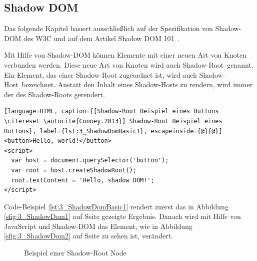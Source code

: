 \subsection{Shadow DOM}
\label{sec:3_WC_Shadow_DOM}

Das folgende Kapitel basiert ausschließlich auf der Spezifikation von Shadow-DOM des W3C \citereset \autocite[siehe][]{GlazkovShadowDOM.2013} und auf dem Artikel \glqq Shadow DOM 101\grqq\ \citereset \autocite[siehe][]{Cooney.2013}.

Mit Hilfe von Shadow-DOM können Elemente mit einer neuen Art von Knoten verbunden werden. Diese neue Art von Knoten wird auch \glqq Shadow-Root\grqq\ genannt. Ein Element, das einer Shadow-Root zugeordnet ist, wird auch \glqq Shadow-Host\grqq\ bezeichnet. Anstatt den Inhalt eines Shadow-Hosts zu rendern, wird immer der des Shadow-Roots gerendert.

\begin{lstlisting}[language=HTML, caption={[Shadow-Root Beispiel eines Buttons \citereset \autocite{Cooney.2013}] Shadow-Root Beispiel eines Buttons}, label={lst:3_ShadowDomBasic1}, escapeinside={@}{@}]
<button>Hello, world!</button>
<script>
  var host = document.querySelector('button');
  var root = host.createShadowRoot();
  root.textContent = 'Hello, shadow DOM!';
</script>
\end{lstlisting}

Code-Beispiel \ref{lst:3_ShadowDomBasic1} rendert zuerst das in Abbildung \ref{sfig:3_ShadowDom1} auf Seite \pageref{sfig:3_ShadowDom1} gezeigte Ergebnis. Danach wird mit Hilfe von JavaScript und Shadow-DOM das Element, wie in Abbildung \ref{sfig:3_ShadowDom2} auf Seite \pageref{sfig:3_ShadowDom2} zu sehen ist, verändert.

\begin{figure}[h]
  \centering
  \qquad
  \caption[
    Beispiel einer Shadow-Root Node
  ]{
    Beispiel einer Shadow-Root Node
  }
  \label{sfig:3_ShadowDom}
\end{figure}

